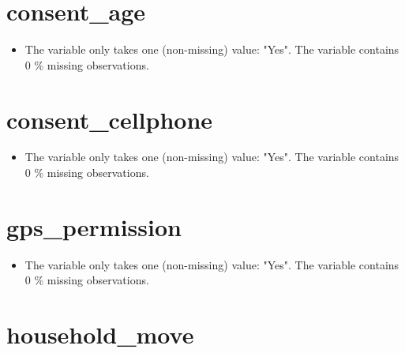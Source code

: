 \documentclass[
]{report}
\providecommand{\tightlist}{%
  \setlength{\itemsep}{0pt}\setlength{\parskip}{0pt}}
\begin{document}
\noindent\makebox[\linewidth]{\rule{\textwidth}{0.4pt}}

\hypertarget{consent_age}{%
\section{consent\_age}\label{consent_age}}

\begin{itemize}
\tightlist
\item
  The variable only takes one (non-missing) value: "Yes". The variable
  contains 0 \% missing observations.
\end{itemize}

\noindent\makebox[\linewidth]{\rule{\textwidth}{0.4pt}}

\hypertarget{consent_cellphone}{%
\section{consent\_cellphone}\label{consent_cellphone}}

\begin{itemize}
\tightlist
\item
  The variable only takes one (non-missing) value: "Yes". The variable
  contains 0 \% missing observations.
\end{itemize}

\noindent\makebox[\linewidth]{\rule{\textwidth}{0.4pt}}

\hypertarget{gps_permission}{%
\section{gps\_permission}\label{gps_permission}}

\begin{itemize}
\tightlist
\item
  The variable only takes one (non-missing) value: "Yes". The variable
  contains 0 \% missing observations.
\end{itemize}

\noindent\makebox[\linewidth]{\rule{\textwidth}{0.4pt}}

\hypertarget{household_move}{%
\section{household\_move}\label{household_move}}
\end{document}
